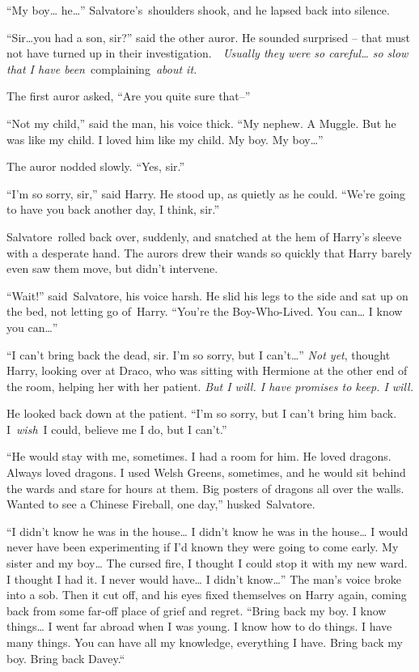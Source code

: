 ``My boy\ldots{} he\ldots{}'' Salvatore's~shoulders shook, and he lapsed
back into silence.

``Sir\ldots you had a son, sir?'' said the other auror. He sounded
surprised -- that must not have turned up in their
investigation.~~\emph{Usually they were so careful\ldots{} so slow that
I have been}~complaining~\emph{about it.}

The first auror asked, ``Are you quite sure that--''

``Not my child,'' said the man, his voice thick. ``My nephew. A Muggle.
But he was like my child. I loved him like my child. My boy. My
boy\ldots{}''

The auror nodded slowly. ``Yes, sir.''

``I'm so sorry, sir,'' said Harry. He stood up, as quietly as he could.
``We're going to have you back another day, I think, sir.''

Salvatore~rolled back over, suddenly, and snatched at the hem of Harry's
sleeve with a desperate hand. The aurors drew their wands so quickly
that Harry barely even saw them move, but didn't intervene.

``Wait!'' said~Salvatore, his voice harsh. He slid his legs to the side
and sat up on the bed, not letting go of~Harry. ``You're the
Boy-Who-Lived. You can\ldots{} I know you can\ldots{}''

``I can't bring back the dead, sir. I'm so sorry, but I can't\ldots{}''
\emph{Not yet}, thought Harry, looking over at Draco, who was sitting
with Hermione at the other end of the room, helping her with her
patient. \emph{But I will. I have promises to keep. I will.}

He looked back down at the patient. ``I'm so sorry, but I can't bring
him back. I~\emph{wish}~I could, believe me I do, but I can't.''

``He would stay with me, sometimes. I had a room for him. He loved
dragons. Always loved dragons. I used Welsh Greens, sometimes, and he
would sit behind the wards and stare for hours at them. Big posters of
dragons all over the walls. Wanted to see a Chinese Fireball, one day,''
husked~Salvatore.

``I didn't know he was in the house\ldots{} I didn't know he was in the
house\ldots{} I would never have been experimenting if I'd known they
were going to come early. My sister and my boy\ldots{} The cursed fire,
I thought I could stop it with my new ward. I thought I had it. I never
would have\ldots{} I didn't know\ldots{}'' The man's voice broke into a
sob. Then it cut off, and his eyes fixed themselves on Harry again,
coming back from some far-off place of grief and regret. ``Bring back my
boy. I know things\ldots{} I went far abroad when I was young. I know
how to do things. I have many things. You can have all my knowledge,
everything I have. Bring back my boy. Bring back Davey.``

